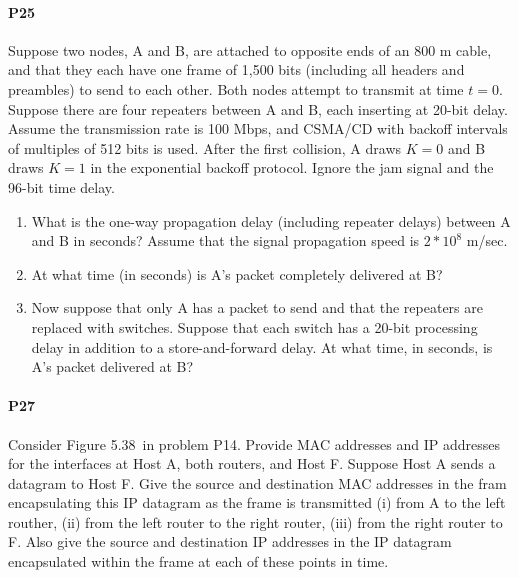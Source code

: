 \documentclass[12pt,letterpaper]{article}
\begin{document}
\paragraph{P25}
Suppose two nodes, A and B, are attached to opposite ends of an 800 m cable, 
and that they each have one frame of 1,500 bits (including all headers and
preambles) to send to each other. Both nodes attempt to transmit at time $t=0$.
Suppose there are four repeaters between A and B, each inserting at 20-bit
delay. Assume the transmission rate is 100 Mbps, and CSMA/CD with backoff
intervals of multiples of 512 bits is used. After the first collision, A draws
$K=0$ and B draws $K=1$ in the exponential backoff protocol. Ignore the jam
signal and the 96-bit time delay.
\begin{enumerate}
\item What is the one-way propagation delay (including repeater delays) between
    A and B in seconds? Assume that the signal propagation speed is $2*10^8$
    m/sec.
\item At what time (in seconds) is A's packet completely delivered at B?
\item Now suppose that only A has a packet to send and that the repeaters are
    replaced with switches. Suppose that each switch has a 20-bit processing
    delay in addition to a store-and-forward delay. At what time, in seconds,
    is A's packet delivered at B?
\end{enumerate}

\paragraph{P27}
Consider Figure 5.38\ in problem P14. Provide MAC addresses and IP addresses
for the interfaces at Host A, both routers, and Host F. Suppose Host A sends a
datagram to Host F. Give the source and destination MAC addresses in the fram 
encapsulating this IP datagram as the frame is transmitted (i) from A to the
left routher, (ii) from the left router to the right router, (iii) from the
right router to F. Also give the source and destination IP addresses in the IP
datagram encapsulated within the frame at each of these points in time.
\end{document}
